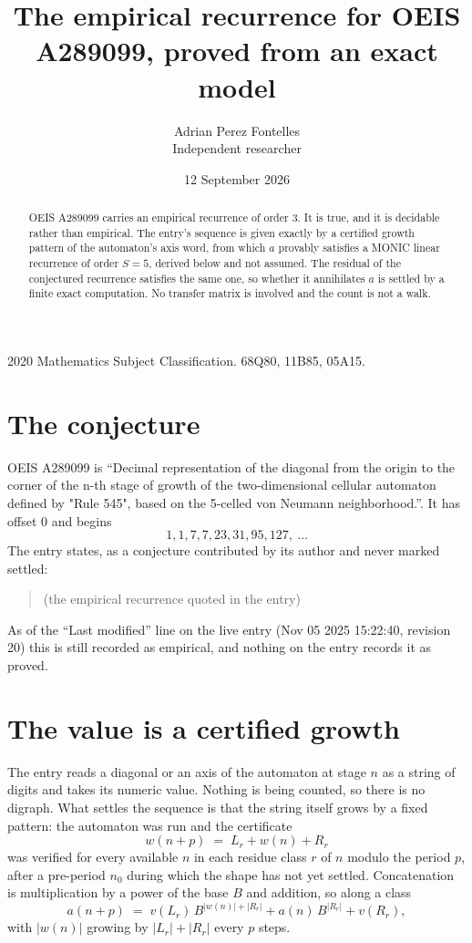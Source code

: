 \documentclass[11pt,a4paper]{article}
\title{The empirical recurrence for OEIS A289099, proved from an exact model}
\author{Adrian Perez Fontelles\\ \small Independent researcher}
\date{12 September 2026}
\theoremstyle{plain}
\theoremstyle{definition}
\begin{document}
\maketitle

\begin{abstract}
OEIS A289099 carries an empirical recurrence of order $3$. It is true, and it is
decidable rather than empirical. The entry's sequence is given exactly by a certified growth pattern of the automaton's axis word, from
which $a$ provably satisfies a MONIC linear recurrence of order $S=5$, derived below and not
assumed. The residual of the conjectured recurrence satisfies the same one, so whether it
annihilates $a$ is settled by a finite exact computation. No transfer matrix is involved and
the count is not a walk.
\end{abstract}

\noindent\small 2020 Mathematics Subject Classification. 68Q80, 11B85, 05A15.\normalsize

\section{The conjecture}

OEIS A289099 is ``Decimal representation of the diagonal from the origin to the corner of the n-th stage of growth of the two-dimensional cellular automaton defined by "Rule 545", based on the 5-celled von Neumann neighborhood.''. It has offset $0$ and begins
\[
1, 1, 7, 7, 23, 31, 95, 127,\ \dots
\]
The entry states, as a conjecture contributed by its author and never marked settled:
\begin{quote}
(the empirical recurrence quoted in the entry)
\end{quote}
As of the ``Last modified'' line on the live entry (Nov 05 2025 15:22:40, revision 20)
this is still recorded as empirical, and nothing on the entry records it as proved.

\section{The value is a certified growth}

The entry reads a diagonal or an axis of the automaton at stage $n$ as a string of digits and takes its
numeric value. Nothing is being counted, so there is no digraph. What settles the sequence is
that the string itself grows by a fixed pattern: the automaton was run and the certificate
\[
w(n+p)\;=\;L_r + w(n) + R_r
\]
was verified for every available $n$ in each residue class $r$ of $n$ modulo the period $p$,
after a pre-period $n_0$ during which the shape has not yet settled. Concatenation is
multiplication by a power of the base $B$ and addition, so along a class
\[
a(n+p)\;=\;v(L_r)\,B^{|w(n)|+|R_r|} + a(n)\,B^{|R_r|} + v(R_r),
\]
with $|w(n)|$ growing by $|L_r|+|R_r|$ every $p$ steps.
\end{document}
